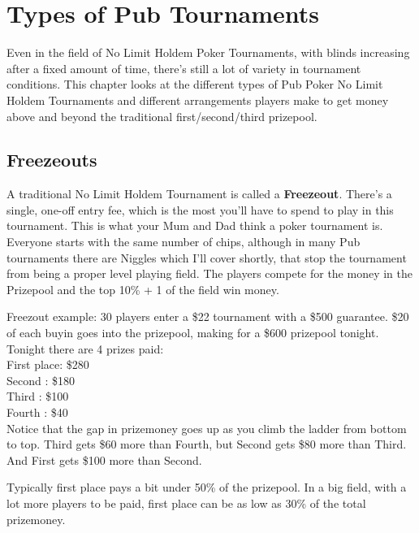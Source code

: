 \chapter{Types of Pub Tournaments}


Even in the field of No Limit Holdem Poker Tournaments,
with blinds increasing after a fixed amount of time, there's still a
lot of variety in tournament conditions. This chapter
looks at the different types of Pub Poker No Limit Holdem Tournaments
and different arrangements players make to get money above and
beyond the traditional first/second/third prizepool.

\section{Freezeouts}

A traditional No Limit Holdem Tournament is called a \textbf{Freezeout}.
There's a single, one-off entry fee, which is the most you'll have to
spend to play in this tournament. This is what your Mum and Dad
think a poker tournament is. Everyone starts with the same number
of chips, although in many Pub tournaments there are Niggles which
I'll cover shortly, that stop the tournament from being a proper
level playing field. The players compete for the
money in the Prizepool and the top 10\% + 1 of the field win money.

Freezout example: 30 players enter a \$22 tournament with a \$500
guarantee. \$20 of each buyin goes into the prizepool, making for a \$600
prizepool tonight. Tonight there are 4 prizes paid: \\
First place: \$280 \\
Second     : \$180 \\
Third      : \$100 \\
Fourth     :  \$40  \\


Notice that the gap in prizemoney goes up as you climb the ladder
from bottom to top. Third gets \$60 more than Fourth, but Second gets
\$80 more than Third. And First gets \$100 more than Second.

Typically first place pays a bit under 50\% of the prizepool. In a
big field, with a lot more players to be paid, first place can
be as low as 30\% of the total prizemoney.


